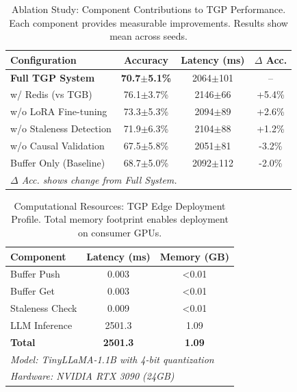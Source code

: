 \documentclass[letterpaper]{article}
\begin{document}
\begin{table}[t]
\centering
\caption{Ablation Study: Component Contributions to TGP Performance.
Each component provides measurable improvements. Results show mean across seeds.}
\label{tab:ablation_study}
\begin{tabular}{l c c c}
\toprule
\textbf{Configuration} & \textbf{Accuracy} & \textbf{Latency (ms)} & \textbf{$\Delta$ Acc.} \\
\midrule
\textbf{Full TGP System} & \textbf{70.7$\pm$5.1\%} & 2064$\pm$101 & -- \\
w/ Redis (vs TGB) & 76.1$\pm$3.7\% & 2146$\pm$66 & +5.4\% \\
w/o LoRA Fine-tuning & 73.3$\pm$5.3\% & 2094$\pm$89 & +2.6\% \\
w/o Staleness Detection & 71.9$\pm$6.3\% & 2104$\pm$88 & +1.2\% \\
w/o Causal Validation & 67.5$\pm$5.8\% & 2051$\pm$81 & -3.2\% \\
Buffer Only (Baseline) & 68.7$\pm$5.0\% & 2092$\pm$112 & -2.0\% \\

\midrule
\multicolumn{4}{l}{\textit{$\Delta$ Acc. shows change from Full System.}} \\
\bottomrule
\end{tabular}
\end{table}



\begin{table}[t]
\centering
\caption{Computational Resources: TGP Edge Deployment Profile.
Total memory footprint enables deployment on consumer GPUs.}
\label{tab:computational_cost}
\begin{tabular}{l c c}
\toprule
\textbf{Component} & \textbf{Latency (ms)} & \textbf{Memory (GB)} \\
\midrule
Buffer Push & 0.003 & <0.01 \\
Buffer Get & 0.003 & <0.01 \\
Staleness Check & 0.009 & <0.01 \\
LLM Inference & 2501.3 & 1.09 \\
\midrule
\textbf{Total} & \textbf{2501.3} & \textbf{1.09} \\

\midrule
\multicolumn{3}{l}{\textit{Model: TinyLLaMA-1.1B with 4-bit quantization}} \\
\multicolumn{3}{l}{\textit{Hardware: NVIDIA RTX 3090 (24GB)}} \\
\bottomrule
\end{tabular}
\end{table}
\end{document}
